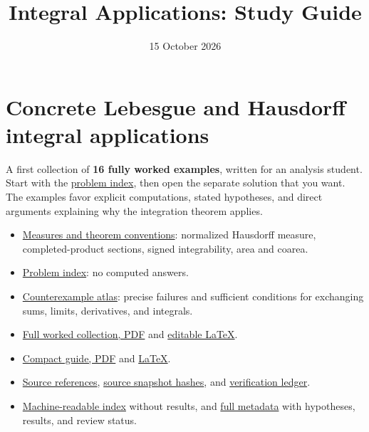 \documentclass[
  11pt,
]{article}
\title{Integral Applications: Study Guide}
\author{}
\date{15 October 2026}
\providecommand{\tightlist}{%
  \setlength{\itemsep}{0pt}\setlength{\parskip}{0pt}}
\begin{document}
\maketitle

{
\hypersetup{linkcolor=}
\setcounter{tocdepth}{3}
\tableofcontents
}
\section{Concrete Lebesgue and Hausdorff integral
applications}\label{start}

A first collection of \textbf{16 fully worked examples}, written for an
analysis student. Start with the \hyperref[problems]{problem index},
then open the separate solution that you want. The examples favor
explicit computations, stated hypotheses, and direct arguments
explaining why the integration theorem applies.

\begin{itemize}
\tightlist
\item
  \hyperref[conventions]{Measures and theorem conventions}: normalized
  Hausdorff measure, completed-product sections, signed integrability,
  area and coarea.
\item
  \hyperref[problems]{Problem index}: no computed answers.
\item
  \hyperref[atlas]{Counterexample atlas}: precise failures and
  sufficient conditions for exchanging sums, limits, derivatives, and
  integrals.
\item
  \href{https://github.com/Drsunflowerherbert/Codex-for-Math/tree/codex/integral-examples-2026-10-15/integral-examples/pdf/integral-examples.pdf}{Full
  worked collection, PDF} and
  \href{https://github.com/Drsunflowerherbert/Codex-for-Math/tree/codex/integral-examples-2026-10-15/integral-examples/pdf/integral-examples.tex}{editable
  LaTeX}.
\item
  \href{https://github.com/Drsunflowerherbert/Codex-for-Math/tree/codex/integral-examples-2026-10-15/integral-examples/pdf/guide.pdf}{Compact
  guide, PDF} and
  \href{https://github.com/Drsunflowerherbert/Codex-for-Math/tree/codex/integral-examples-2026-10-15/integral-examples/pdf/guide.tex}{LaTeX}.
\item
  \hyperref[bibliography]{Source references},
  \href{https://github.com/Drsunflowerherbert/Codex-for-Math/tree/codex/integral-examples-2026-10-15/integral-examples/checks/source-references.json}{source
  snapshot hashes}, and
  \href{https://github.com/Drsunflowerherbert/Codex-for-Math/tree/codex/integral-examples-2026-10-15/integral-examples/VERIFICATION.md}{verification
  ledger}.
\item
  \href{https://github.com/Drsunflowerherbert/Codex-for-Math/tree/codex/integral-examples-2026-10-15/integral-examples/index.json}{Machine-readable
  index} without results, and
  \href{https://github.com/Drsunflowerherbert/Codex-for-Math/tree/codex/integral-examples-2026-10-15/integral-examples/metadata.json}{full
  metadata} with hypotheses, results, and review status.
\end{itemize}
\end{document}
